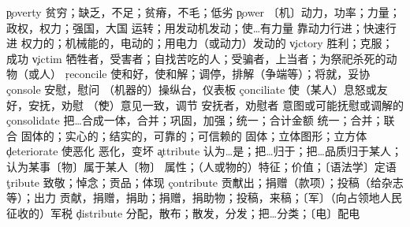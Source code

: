 \begin{multicols}{2}
\c{poverty}  \n 贫穷；缺乏，不足；贫瘠，不毛；低劣
\c{power}  \n 〔机〕动力，功率；力量；政权，权力；强国，大国 \vt 运转；用发动机发动；使…有力量 \vi 靠动力行进；快速行进 \a 权力的；机械能的，电动的；用电力（或动力）发动的
\c{victory}  \n 胜利；克服；成功
\c{victim}  \n 牺牲者，受害者；自找苦吃的人；受骗者，上当者；为祭祀杀死的动物（或人）
\c{reconcile}  \vt 使和好，使和解；调停，排解（争端等）；将就，妥协 
\c{console}  \vt 安慰，慰问 \n （机器的）操纵台，仪表板
\c{conciliate}  \vt 使（某人）息怒或友好，安抚，劝慰 \v （使）意见一致，调节 \n 安抚者，劝慰者 \a 意图或可能抚慰或调解的
\c{consolidate}  \vt 把…合成一体，合并；巩固，加强；统一；合计金额 \vi 统一；合并；联合
  \a 固体的；实心的；结实的，可靠的；可信赖的 \n 固体；立体图形；立方体
\c{deteriorate}  \vt 使恶化 \vi 恶化，变坏
\c{attribute}  \vt 认为…是；把…归于；把…品质归于某人；认为某事〔物〕属于某人〔物〕  \n 属性；（人或物的）特征；价值；〔语法学〕定语
\c{tribute}  \n 致敬；悼念；贡品；体现 
\c{contribute}  \v 贡献出；捐赠（款项）；投稿（给杂志等）；出力
  \n 贡献，捐赠，捐助；捐赠，捐助物；投稿，来稿；〔军〕（向占领地人民征收的）军税 
\c{distribute}  \vt 分配，散布；散发，分发；把…分类；〔电〕配电



\end{multicols}
